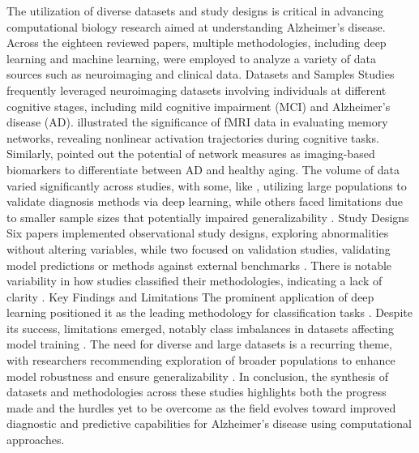 \documentclass{MITcsail}
\begin{document}
The utilization of diverse datasets and study designs is critical in advancing computational biology research aimed at understanding Alzheimer's disease. Across the eighteen reviewed papers, multiple methodologies, including deep learning and machine learning, were employed to analyze a variety of data sources such as neuroimaging and clinical data. Datasets and Samples Studies frequently leveraged neuroimaging datasets involving individuals at different cognitive stages, including mild cognitive impairment (MCI) and Alzheimer's disease (AD). \citet{ref_10_1523_jneurosci_2250_06_2006} illustrated the significance of fMRI data in evaluating memory networks, revealing nonlinear activation trajectories during cognitive tasks. Similarly, \citet{ref_10_1371_journal_pcbi_1000100} pointed out the potential of network measures as imaging-based biomarkers to differentiate between AD and healthy aging. The volume of data varied significantly across studies, with some, like \citet{ref_10_1148_radiol_2018180958}, utilizing large populations to validate diagnosis methods via deep learning, while others faced limitations due to smaller sample sizes that potentially impaired generalizability \citep{ref_10_1111_jon_12214,ref_10_1523_jneurosci_2250_06_2006}. Study Designs Six papers implemented observational study designs, exploring abnormalities without altering variables, while two focused on validation studies, validating model predictions or methods against external benchmarks \citep{ref_10_1109_access_2021_3090474,ref_10_1016_j_jalz_2019_02_007}. There is notable variability in how studies classified their methodologies, indicating a lack of clarity \citep{ref_10_1016_j_neuroimage_2014_06_077,ref_10_1016_j_neuroimage_2019_01_031}. Key Findings and Limitations The prominent application of deep learning positioned it as the leading methodology for classification tasks \citep{ref_10_1109_isbi_2014_6868045,ref_10_3389_fnagi_2019_00220}. Despite its success, limitations emerged, notably class imbalances in datasets affecting model training \citep{ref_10_1109_access_2021_3090474}. The need for diverse and large datasets is a recurring theme, with researchers recommending exploration of broader populations to enhance model robustness and ensure generalizability \citep{ref_10_1002_alz_13390,ref_10_3389_fpubh_2022_853294}. In conclusion, the synthesis of datasets and methodologies across these studies highlights both the progress made and the hurdles yet to be overcome as the field evolves toward improved diagnostic and predictive capabilities for Alzheimer's disease using computational approaches.
\end{document}
